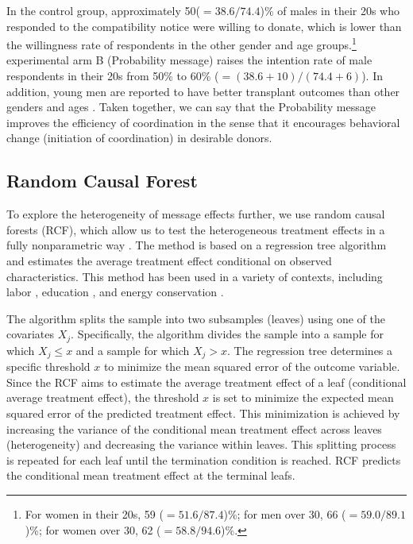 \documentclass[
]{article}
\begin{document}
In the control group, approximately 50(\(=38.6/74.4\))\% of males in their 20s who responded to the compatibility notice were willing to donate, which is lower than the willingness rate of respondents in the other gender and age groups.\footnote{For women in their 20s, 59 (\(=51.6/87.4\))\%; for men over 30, 66 (\(=59.0/89.1\))\%; for women over 30, 62 (\(=58.8/94.6\))\%.} experimental arm B (Probability message) raises the intention rate of male respondents in their 20s from 50\% to 60\% (\(=(38.6 + 10)/(74.4 + 6)\)). In addition, young men are reported to have better transplant outcomes than other genders and ages \citep[e.g.,][]{Kollman2016}. Taken together, we can say that the Probability message improves the efficiency of coordination in the sense that it encourages behavioral change (initiation of coordination) in desirable donors.

\hypertarget{rcf}{%
\subsection{Random Causal Forest}\label{rcf}}

To explore the heterogeneity of message effects further, we use random causal forests (RCF), which allow us to test the heterogeneous treatment effects in a fully nonparametric way \citep{Athey2016, Wager2018}. The method is based on a regression tree algorithm and estimates the average treatment effect conditional on observed characteristics. This method has been used in a variety of contexts, including labor \citep{Davis2017}, education \citep{Carlana2022}, and energy conservation \citep{Murakami2022}.

The algorithm splits the sample into two subsamples (leaves) using one of the covariates \(X_j\). Specifically, the algorithm divides the sample into a sample for which \(X_j \le x\) and a sample for which \(X_j > x\). The regression tree determines a specific threshold \(x\) to minimize the mean squared error of the outcome variable. Since the RCF aims to estimate the average treatment effect of a leaf (conditional average treatment effect), the threshold \(x\) is set to minimize the expected mean squared error of the predicted treatment effect. This minimization is achieved by increasing the variance of the conditional mean treatment effect across leaves (heterogeneity) and decreasing the variance within leaves. This splitting process is repeated for each leaf until the termination condition is reached. RCF predicts the conditional mean treatment effect at the terminal leafs.
\end{document}
